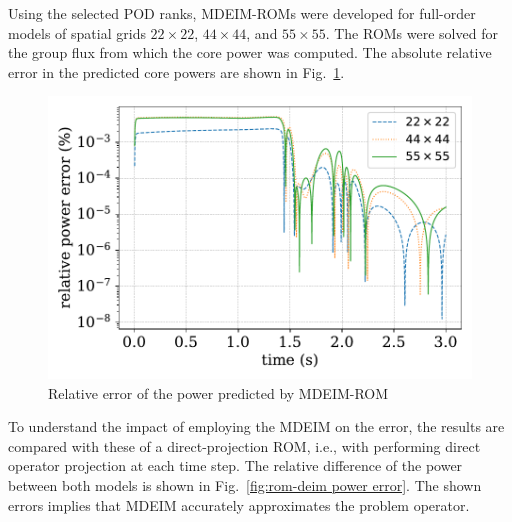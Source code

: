 \documentclass[review,number,sort&compress,12pt]{elsarticle}
\begin{document}
Using the selected POD ranks, MDEIM-ROMs were developed for full-order models of spatial grids $22\times 22$, $44\times44$, and $55 \times 55$.
The ROMs were solved for the group flux from which the core power was computed.
The absolute relative error in the predicted core powers are shown in Fig.~\ref{fig:deim power error}.

\begin{figure}[H]
	\includegraphics[width=1.0\linewidth]{../figures/LRA_power_deim_relative_error.pdf}
	\caption{Relative error of the power predicted by MDEIM-ROM}
	\label{fig:deim power error}
\end{figure}
To understand the impact of employing the MDEIM on the error, the results are compared with these of a direct-projection ROM, i.e., with performing direct operator projection at each time step.
The relative difference of the power between both models is shown in Fig.~\ref{fig:rom-deim power error}.
The shown errors implies that MDEIM accurately approximates the problem operator.
\end{document}
